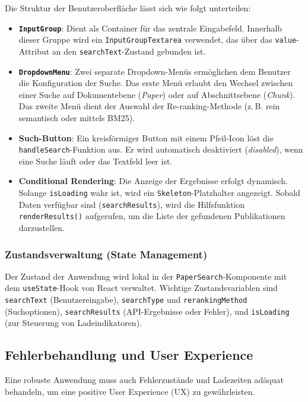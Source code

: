 Die Struktur der Benutzeroberfläche lässt sich wie folgt unterteilen:
\begin{itemize}
	\item \textbf{\texttt{InputGroup}}: Dient als Container für das zentrale Eingabefeld. Innerhalb dieser Gruppe wird ein \texttt{InputGroupTextarea} verwendet, das über das \texttt{value}-Attribut an den \texttt{searchText}-Zustand gebunden ist.
	\item \textbf{\texttt{DropdownMenu}}: Zwei separate Dropdown-Menüs ermöglichen dem Benutzer die Konfiguration der Suche. Das erste Menü erlaubt den Wechsel zwischen einer Suche auf Dokumentebene (\textit{Paper}) oder auf Abschnittsebene (\textit{Chunk}). Das zweite Menü dient der Auswahl der Re-ranking-Methode (z.\,B. rein semantisch oder mittels BM25).
	\item \textbf{Such-Button}: Ein kreisförmiger Button mit einem Pfeil-Icon löst die \texttt{handleSearch}-Funktion aus. Er wird automatisch deaktiviert (\textit{disabled}), wenn eine Suche läuft oder das Textfeld leer ist.
	\item \textbf{Conditional Rendering}: Die Anzeige der Ergebnisse erfolgt dynamisch. Solange \texttt{isLoading} wahr ist, wird ein \texttt{Skeleton}-Platzhalter angezeigt. Sobald Daten verfügbar sind (\texttt{searchResults}), wird die Hilfsfunktion \texttt{renderResults()} aufgerufen, um die Liste der gefundenen Publikationen darzustellen.
\end{itemize}

\subsubsection{Zustandsverwaltung (State Management)}
Der Zustand der Anwendung wird lokal in der \texttt{PaperSearch}-Komponente mit dem \texttt{useState}-Hook von React verwaltet. Wichtige Zustandsvariablen sind \texttt{searchText} (Benutzereingabe), \texttt{searchType} und \texttt{rerankingMethod} (Suchoptionen), \texttt{searchResults} (API-Ergebnisse oder Fehler), und \texttt{isLoading} (zur Steuerung von Ladeindikatoren).



\subsection{Fehlerbehandlung und User Experience}
Eine robuste Anwendung muss auch Fehlerzustände und Ladezeiten adäquat behandeln, um eine positive User Experience (UX) zu gewährleisten.


